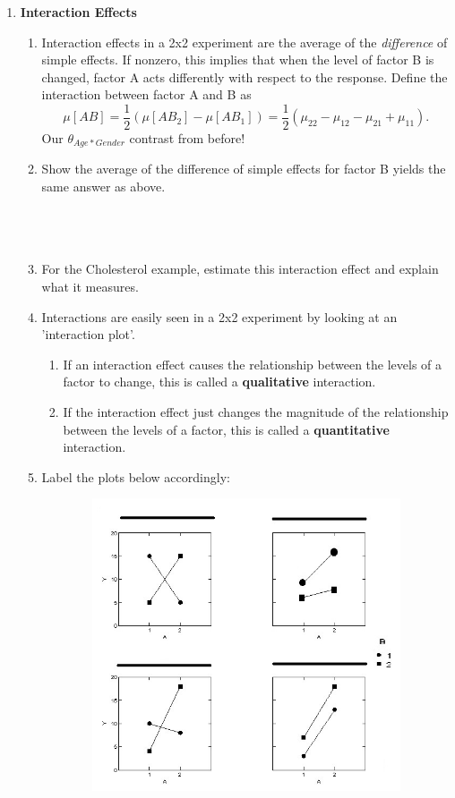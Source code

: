 \begin{enumerate}
\item \textbf{Interaction Effects}
\begin{enumerate}
\item Interaction effects in a 2x2 experiment are the average of the \textit{difference} of simple effects.  If nonzero, this implies that when the level of factor B is changed, factor A acts differently with respect to the response.  Define the interaction between factor A and B as
$$\mu[AB]=\frac{1}{2}(\mu[AB_2]-\mu[AB_1])=\frac{1}{2}(\mu_{22}-\mu_{12}-\mu_{21}+\mu_{11}).$$
Our $\theta_{Age*Gender}$ contrast from before!
\item Show the average of the difference of simple effects for factor B yields the same answer as above.\\~\\~\\~\\
\item For the Cholesterol example, estimate this interaction effect and explain what it measures.
\newpage
\item Interactions are easily seen in a 2x2 experiment by looking at an 'interaction plot'.  
\begin{enumerate}
\item If an interaction effect causes the relationship between the levels of a factor to change, this is called a \textbf{qualitative} interaction.  
\item If the interaction effect just changes the magnitude of the relationship between the levels of a factor, this is called a \textbf{quantitative} interaction.
\end{enumerate}
\item Label the plots below accordingly:
\begin{center}
\includegraphics[height=3.4in,width=5in]{interact}

\end{center}
\end{enumerate}
\end{enumerate}
